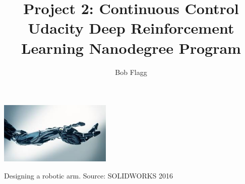 \documentclass[sigchi]{acmart}
\begin{document}
%
\title{    
	Project 2: Continuous Control\\
	{\large Udacity Deep Reinforcement Learning Nanodegree Program}
}

%
\author{Bob Flagg}\affiliation{}

%
\renewcommand{\shortauthors}{Bob Flagg}

%

%
%

%
\begin{teaserfigure}
	\centering
  \includegraphics[width=0.4\textwidth]{arm}
  \caption{Designing a robotic arm. Source: SOLIDWORKS 2016~\protect\cite{10.1007/978-3-319-52941-7_18}}
  \label{fig:teaser}
\end{teaserfigure}

%
\maketitle

\end{document}
